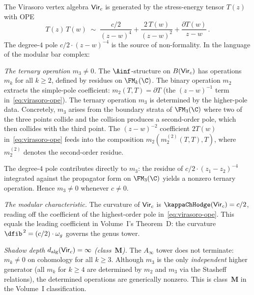 \begin{example}
\label{ex:virasoro-nonformality}
The Virasoro vertex algebra $\mathsf{Vir}_c$ is generated by the
stress-energy tensor $T(z)$ with OPE
\begin{equation}\label{eq:virasoro-ope}
 T(z)\, T(w) \;\sim\;
 \frac{c/2}{(z-w)^4}
 + \frac{2\, T(w)}{(z-w)^2}
 + \frac{\partial T(w)}{z-w}\,.
\end{equation}
The degree-$4$ pole $c/2 \cdot (z-w)^{-4}$ is the source of
non-formality. In the language of the modular bar complex:

\medskip\noindent
\emph{The ternary operation $m_3 \neq 0$.}
The $\Ainf$-structure on $B(\mathsf{Vir}_c)$ has operations
$m_k$ for all $k \ge 2$, defined by residues on $\FM_k(\C)$.
The binary operation $m_2$ extracts the simple-pole
coefficient: $m_2(T, T) = \partial T$ (the $(z-w)^{-1}$ term
in~\eqref{eq:virasoro-ope}).
The ternary operation $m_3$ is determined by the
higher-pole data. Concretely, $m_3$ arises from the boundary
strata of $\FM_3(\C)$ where two of the three points collide
and the collision produces a second-order pole, which then
collides with the third point. The $(z-w)^{-2}$ coefficient
$2T(w)$ in~\eqref{eq:virasoro-ope} feeds into the composition
$m_2(m_2^{(2)}(T, T), T)$, where $m_2^{(2)}$ denotes the
second-order residue.

The degree-$4$ pole contributes directly to $m_3$: the residue
of $c/2 \cdot (z_1 - z_2)^{-4}$ integrated against the
propagator form on $\FM_3(\C)$ yields a nonzero ternary
operation. Hence $m_3 \neq 0$ whenever $c \neq 0$.

\medskip\noindent
\emph{The modular characteristic.}
The curvature of $\mathsf{Vir}_c$ is
$\kappaChHodge(\Vir_c) = c/2$,
reading off the coefficient of the highest-order pole
in~\eqref{eq:virasoro-ope}.
This equals the leading coefficient in Volume~I's
Theorem~D: the curvature $\dfib^{\,2} = (c/2) \cdot \omega_g$
governs the genus tower.

\medskip\noindent
\emph{Shadow depth $d_{\mathrm{alg}}(\mathsf{Vir}_c) = \infty$ (class~$\mathbf{M}$).}
The $A_\infty$ tower does not terminate: $m_k \neq 0$ on
cohomology for all $k \ge 3$. Although $m_3$ is the
only \emph{independent} higher generator (all $m_k$ for
$k \ge 4$ are determined by $m_2$ and $m_3$ via the
Stasheff relations), the determined operations are generically
nonzero. This is class~$\mathbf{M}$ in the Volume~I
classification.
\end{example}

